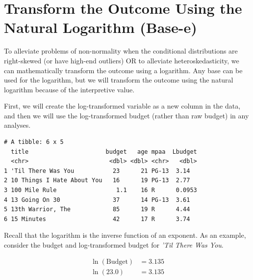 \documentclass[]{book}
\newenvironment{Shaded}{\begin{snugshade}}{\end{snugshade}}
\newcommand{\CommentTok}[1]{\textcolor[rgb]{0.56,0.35,0.01}{\textit{#1}}}
\newcommand{\DataTypeTok}[1]{\textcolor[rgb]{0.13,0.29,0.53}{#1}}
\newcommand{\KeywordTok}[1]{\textcolor[rgb]{0.13,0.29,0.53}{\textbf{#1}}}
\newcommand{\NormalTok}[1]{#1}
\newcommand{\OperatorTok}[1]{\textcolor[rgb]{0.81,0.36,0.00}{\textbf{#1}}}
\newcommand{\StringTok}[1]{\textcolor[rgb]{0.31,0.60,0.02}{#1}}
\begin{document}
\hypertarget{transform-the-outcome-using-the-natural-logarithm-base-e}{%
\section{Transform the Outcome Using the Natural Logarithm (Base-e)}\label{transform-the-outcome-using-the-natural-logarithm-base-e}}

To alleviate problems of non-normality when the conditional distributions are right-skewed (or have high-end outliers) OR to alleviate heteroskedasticity, we can mathematically transform the outcome using a logarithm. Any base can be used for the logarithm, but we will transform the outcome using the natural logarithm because of the interpretive value.

First, we will create the log-transformed variable as a new column in the data, and then we will use the log-transformed budget (rather than raw budget) in any analyses.

\begin{Shaded}
\end{Shaded}

\begin{verbatim}
# A tibble: 6 x 5
  title                      budget   age mpaa  Lbudget
  <chr>                       <dbl> <dbl> <chr>   <dbl>
1 'Til There Was You           23      21 PG-13  3.14  
2 10 Things I Hate About You   16      19 PG-13  2.77  
3 100 Mile Rule                 1.1    16 R      0.0953
4 13 Going On 30               37      14 PG-13  3.61  
5 13th Warrior, The            85      19 R      4.44  
6 15 Minutes                   42      17 R      3.74  
\end{verbatim}

Recall that the logarithm is the inverse function of an exponent. As an example, consider the budget and log-transformed budget for \emph{'Til There Was You}.

\[
\begin{split}
\ln(\textrm{Budget}) &= 3.135 \\
\ln(23.0) &= 3.135 \\
\end{split}
\]
\end{document}
